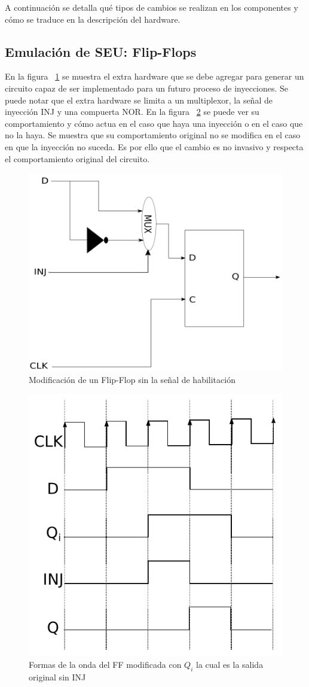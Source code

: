 \documentclass[a4paper,openright,12pt]{report}
\begin{document}
A continuación se detalla qué tipos de cambios se realizan en los componentes y cómo se traduce en la descripción del hardware.



\subsection{Emulación de SEU: Flip-Flops}
En la figura ~\ref{FF} se muestra el extra hardware que se debe agregar para generar un circuito capaz de ser implementado para un futuro proceso de inyecciones. Se puede notar que el extra hardware se limita a un multiplexor, la señal de inyección INJ y una compuerta NOR.
En la figura ~\ref{FFS} se puede ver su comportamiento y cómo  actua en el caso que haya una inyección o en el caso que no la haya. Se muestra que su comportamiento original no se modifica en el caso en que la inyección  no suceda. Es por ello que el cambio es no invasivo y respecta el comportamiento original del circuito.


\begin{figure}[H]
	\centering
	\includegraphics[width=0.55 \textwidth]{img/FF.png}
	\caption{Modificación de un Flip-Flop sin la señal de habilitación}
	\label{FF}
\end{figure}

\begin{figure}[H]
	\centering
	\includegraphics[width=0.48 \textwidth]{img/dessin.pdf}
	\caption{Formas de la onda del FF modificada con  $Q_{i}$ la cual es la salida original sin INJ }
	\label{FFS}
\end{figure}
\end{document}
